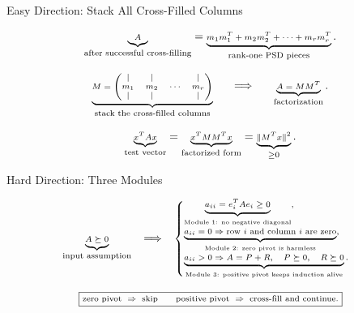 \documentclass[10pt]{beamer}
\theoremstyle{definition}
\begin{document}
\begin{frame}[shrink=8]{Easy Direction: Stack All Cross-Filled Columns}

\[
\scriptsize
\underbrace{A}_{\text{after successful cross-filling}}
=
\underbrace{m_1m_1^T+m_2m_2^T+\cdots+m_rm_r^T}_{\text{rank-one PSD pieces}}.
\]

\vfill

\[
\scriptsize
\underbrace{
M=
\begin{pmatrix}
|&|&&|\\
m_1&m_2&\cdots&m_r\\
|&|&&|
\end{pmatrix}}_{\text{stack the cross-filled columns}}
\qquad\Longrightarrow\qquad
\underbrace{A=MM^T}_{\text{factorization}}.
\]

\vfill

\[
\scriptsize
\underbrace{x^TAx}_{\text{test vector}}
=
\underbrace{x^TMM^Tx}_{\text{factorized form}}
=
\underbrace{\|M^Tx\|^2}_{\ge0}.
\]

\end{frame}


\begin{frame}[shrink=8]{Hard Direction: Three Modules}

\[
\scriptsize
\underbrace{A\succeq0}_{\text{input assumption}}
\quad\Longrightarrow\quad
\begin{cases}
\underbrace{a_{ii}=e_i^TAe_i\ge0}_{\text{Module 1: no negative diagonal}},\\[0.5em]
\underbrace{a_{ii}=0\Rightarrow \text{row }i\text{ and column }i\text{ are zero}}_{\text{Module 2: zero pivot is harmless}},\\[0.5em]
\underbrace{a_{ii}>0\Rightarrow A=P+R,\quad P\succeq0,\quad R\succeq0}_{\text{Module 3: positive pivot keeps induction alive}}.
\end{cases}
\]

\vfill

\[
\scriptsize
\boxed{
\text{zero pivot }\Rightarrow\text{ skip}
\qquad
\text{positive pivot }\Rightarrow\text{ cross-fill and continue}.}
\]

\end{frame}
\end{document}
